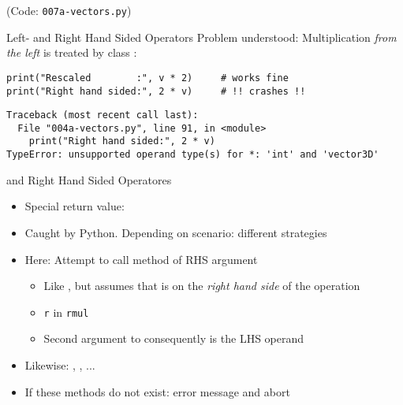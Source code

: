 
\begin{frame}
%
\begin{center}
	(Code: \texttt{007a-vectors.py})
\end{center}
%
\end{frame}


\begin{frame}[fragile]{Left- and Right Hand Sided Operators}
%
Problem understood: Multiplication \emph{from the left} is treated by class :
\begin{warnbox}[Example: Right Hand Sided Multiplication, leftupper=6mm]
\begin{verbatim}
print("Rescaled        :", v * 2)     # works fine
print("Right hand sided:", 2 * v)     # !! crashes !!
\end{verbatim}
\end{warnbox}
%
\begin{cmdbox}
\begin{verbatim}
Traceback (most recent call last):
  File "004a-vectors.py", line 91, in <module>
    print("Right hand sided:", 2 * v)
TypeError: unsupported operand type(s) for *: 'int' and 'vector3D'
\end{verbatim}
\end{cmdbox}
%
\end{frame}


\begin{frame}[fragile]{ and Right Hand Sided Operatores}
%
\begin{itemize}
\item Special return value: 
\item Caught by Python. Depending on scenario: different strategies
\item Here: Attempt to call method  of RHS argument
	\begin{itemize}
	\item Like , but assumes that  is on the \emph{right hand side} of the operation
	\item[\Thus] \texttt{r} in \texttt{rmul}
	\item[\Thus] Second argument to  consequently is the LHS operand
	\end{itemize}
\item Likewise: , , ...
\item If these methods do not exist: error message and abort
\end{itemize}
%
\end{frame}

